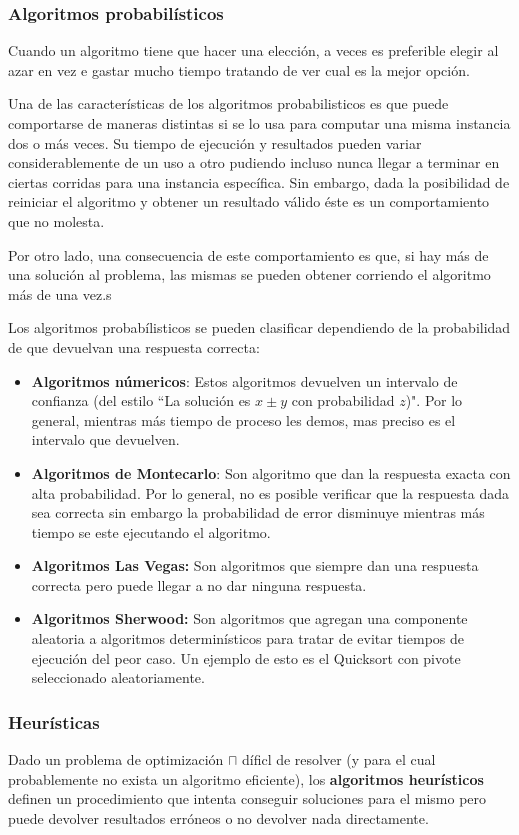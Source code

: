 \subsubsection{Algoritmos probabilísticos}
Cuando un algoritmo tiene que hacer una elección, a veces es preferible elegir al azar en vez e gastar mucho tiempo tratando de ver cual es la mejor opción.

Una de las características de los algoritmos probabilisticos es que puede comportarse de maneras distintas si se lo usa para computar una misma instancia dos o más veces. Su tiempo de ejecución y resultados pueden variar considerablemente de un uso a otro pudiendo incluso nunca llegar a terminar en ciertas corridas para una instancia específica. Sin embargo, dada la posibilidad de reiniciar el algoritmo y obtener un resultado válido éste es un comportamiento que no molesta. 

Por otro lado, una consecuencia de este comportamiento es que, si hay más de una solución al problema, las mismas se pueden obtener corriendo el algoritmo más de una vez.s

Los algoritmos probabílisticos se pueden clasificar dependiendo de la probabilidad de que devuelvan una respuesta correcta:

\begin{itemize}
	\item \textbf{Algoritmos númericos}: Estos algoritmos devuelven un intervalo de confianza (del estilo ``La solución es \( x \pm y\) con probabilidad \(z\))". Por lo general, mientras más tiempo de proceso les demos, mas preciso es el intervalo que devuelven.
	\item \textbf{Algoritmos de Montecarlo}: Son algoritmo que dan la respuesta exacta con alta probabilidad. Por lo general, no es posible verificar que la respuesta dada sea correcta sin embargo la probabilidad de error disminuye mientras más tiempo se este ejecutando el algoritmo.
	\item \textbf{Algoritmos Las Vegas:} Son algoritmos que siempre dan una respuesta correcta pero puede llegar a no dar ninguna respuesta. 
	\item \textbf{Algoritmos Sherwood:} Son algoritmos que agregan una componente aleatoria a algoritmos determinísticos para tratar de evitar tiempos de ejecución del peor caso. Un ejemplo de esto es el Quicksort con pivote seleccionado aleatoriamente.
\end{itemize}

\subsubsection{Heurísticas}
Dado un problema de optimización \(\sqcap\) díficl de resolver (y para el cual probablemente no exista un algoritmo eficiente), los \textbf{algoritmos heurísticos} definen un procedimiento que intenta conseguir soluciones para el mismo pero puede devolver resultados erróneos o no devolver nada directamente.

